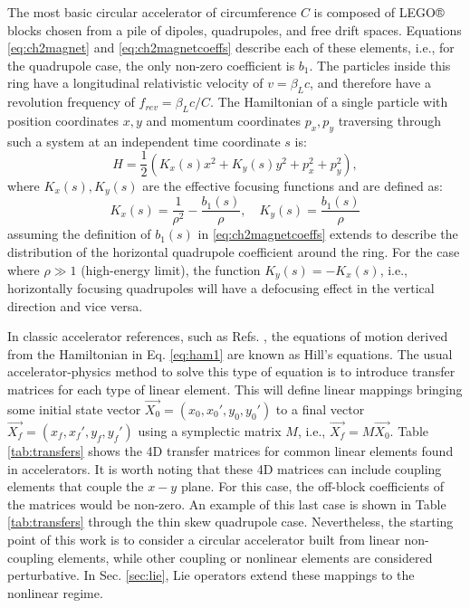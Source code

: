 The most basic circular accelerator of circumference $C$ is composed of LEGO® blocks chosen from a pile of dipoles, quadrupoles, and free drift spaces. Equations \ref{eq:ch2magnet} and \ref{eq:ch2magnetcoeffs} describe each of these elements, i.e., for the quadrupole case, the only non-zero coefficient is $b_1$. The particles inside this ring have a longitudinal relativistic velocity of $v=\beta_L c$, and therefore have a revolution frequency of $f_{rev}=\beta_L c/C$. The Hamiltonian of a single particle with position coordinates $x,y$ and momentum coordinates $p_x,p_y$ traversing through such a system at an independent time coordinate $s$ is:
\begin{equation}
    \label{eq:ham1}
    H=\frac{1}{2}\left( K_x(s)x^2+ K_y(s)y^2+ p_x^2 + p_y^2\right),
\end{equation}
where $K_x(s), K_y(s)$ are the effective focusing functions and are defined as:
\begin{equation}
    \label{eq:kx}
    K_x(s)=\frac{1}{\rho^2}-\frac{b_1(s)}{\rho}, \quad K_y(s)=\frac{b_1(s)}{\rho}
\end{equation}
assuming the definition of $b_1(s)$ in \ref{eq:ch2magnetcoeffs} extends to describe the distribution of the horizontal quadrupole coefficient around the ring. For the case where $\rho\gg 1$ (high-energy limit), the function $K_y(s)=-K_x(s)$, i.e., horizontally focusing quadrupoles will have a defocusing effect in the vertical direction and vice versa. 

In classic accelerator references, such as Refs. \cite{sylee,wolski,Wiedemann2015}, the equations of motion derived from the Hamiltonian in Eq. \ref{eq:ham1} are known as Hill's equations. The usual accelerator-physics method to solve this type of equation is to introduce transfer matrices for each type of linear element. This will define linear mappings bringing some initial state vector $\vec{X_0} = \left( x_0,x_0',y_0,y_0' \right)$ to a final vector $\vec{X_f} = \left( x_f,x_f',y_f,y_f' \right)$ using a symplectic matrix $M$, i.e., $\vec{X_f}=M\vec{X_0}$. Table \ref{tab:transfers} shows the 4D transfer matrices for common linear elements found in accelerators. It is worth noting that these 4D matrices can include coupling elements that couple the $x-y$ plane. For this case, the off-block coefficients of the matrices would be non-zero. An example of this last case is shown in Table \ref{tab:transfers} through the thin skew quadrupole case. Nevertheless, the starting point of this work is to consider a circular accelerator built from linear non-coupling elements, while other coupling or nonlinear elements are considered perturbative. In Sec. \ref{sec:lie}, Lie operators extend these mappings to the nonlinear regime.     

